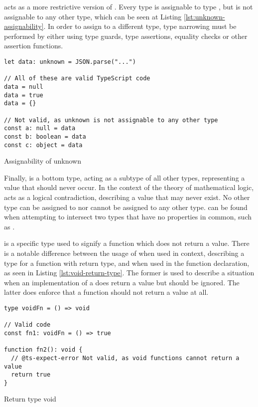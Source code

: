  acts as a more restrictive version of . Every type is assignable to type , but  is not assignable to any other type, which can be seen at Listing \ref{lst:unknown-assignability}. In order to assign  to a different type, type narrowing must be performed by either using type guards, type assertions, equality checks or other assertion functions.

\begin{listing}[ht]
  \begin{verbatim}
let data: unknown = JSON.parse("...") 

// All of these are valid TypeScript code
data = null
data = true
data = {}

// Not valid, as unknown is not assignable to any other type
const a: null = data
const b: boolean = data
const c: object = data
  \end{verbatim}
  \caption{Assignability of unknown}\label{lst:unknown-assignability}
\end{listing}

Finally,  is a bottom type, acting as a subtype of all other types, representing a value that should never occur. In the context of the theory of mathematical logic,  acts as a logical contradiction, describing a value that may never exist. No other type can be assigned to  nor  cannot be assigned to any other type.  can be found when attempting to intersect two types that have no properties in common, such as .

 is a specific type used to signify a function which does not return a value. There is a notable difference between the usage of  when used in context, describing a type for a function with  return type, and when used in the function declaration, as seen in Listing \ref{lst:void-return-type}. The former is used to describe a situation when an implementation of a  does return a value but should be ignored. The latter does enforce that a function should not return a value at all.

\begin{listing}[ht]
  \begin{verbatim}
type voidFn = () => void

// Valid code
const fn1: voidFn = () => true

function fn2(): void {
  // @ts-expect-error Not valid, as void functions cannot return a value
  return true
}
\end{verbatim}
  \caption{Return type void}\label{lst:void-return-type}
\end{listing}

